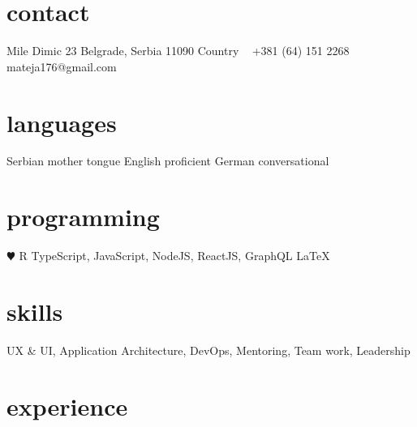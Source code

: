 \documentclass[]{cv-style}          %
\begin{document}


\begin{aside}
  \section{contact}
  Mile Dimic 23
  Belgrade, Serbia 11090
  Country
  ~
  +381 (64) 151 2268
  ~
  mateja176@gmail.com
  \section{languages}
  Serbian mother tongue
  English proficient
  German conversational
  \section{programming}
   {\color{red} $\varheartsuit$} R
  TypeScript, JavaScript, NodeJS, ReactJS, GraphQL
  \LaTeX{}
\end{aside}


\section{skills}
\vspace{-0.2cm}

UX & UI, Application Architecture, DevOps, Mentoring, Team work, Leadership


\section{experience}
\end{document}
